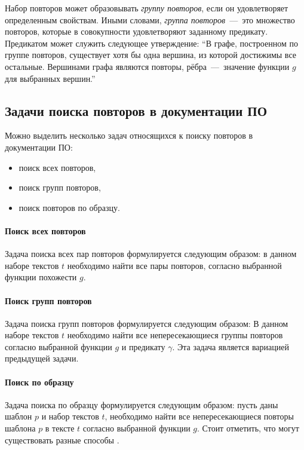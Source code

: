 
Набор повторов может образовывать \emph{группу повторов}, если он удовлетворяет определенным свойствам. Иными словами, \emph{группа повторов}~---~это множество повторов, которые в совокупности удовлетворяют заданному предикату.
Предикатом может служить следующее утверждение: ``В графе, построенном по группе повторов, существует хотя бы одна вершина, из которой достижимы все остальные. Вершинами графа являются повторы, рёбра~---~значение функции
$g$ для выбранных вершин.''


\subsection{Задачи поиска повторов в документации ПО}

Можно выделить несколько задач относящихся к поиску повторов в документации ПО:
\begin{itemize}
\item поиск всех повторов,
\item поиск групп повторов,
\item поиск повторов по образцу.
\end{itemize}

\paragraph{Поиск всех повторов}
Задача поиска всех пар повторов формулируется следующим образом: в данном наборе текстов $t$ необходимо найти все пары повторов, согласно выбранной функции похожести $g$.

\paragraph{Поиск групп повторов}
Задача поиска групп повторов формулируется следующим образом:
В данном наборе текстов $t$ необходимо найти все непересекающиеся группы повторов согласно выбранной функции  $g$ и предикату $\gamma$.
Эта задача является вариацией предыдущей задачи.

\paragraph{Поиск по образцу}
Задача поиска по образцу формулируется следующим образом:
пусть даны шаблон $p$ и набор текстов $t$, необходимо найти все непересекающиеся повторы шаблона $p$ в тексте $t$ согласно выбранной функции  $g$.
Стоит отметить, что могут существовать разные способы .

